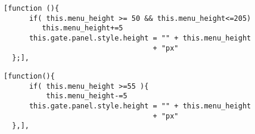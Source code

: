 \begin{lstlisting}[caption=Estado getting\_out]
  [function (){
      if( this.menu_height >= 50 && this.menu_height<=205)
         this.menu_height+=5
      this.gate.panel.style.height = "" + this.menu_height 
                                   + "px"
  };],
\end{lstlisting}


\begin{lstlisting}[caption=Estado getting\_in]
  [function(){
      if( this.menu_height >=55 ){         
          this.menu_height-=5
      this.gate.panel.style.height = "" + this.menu_height 
                                   + "px"
  },],
\end{lstlisting}

